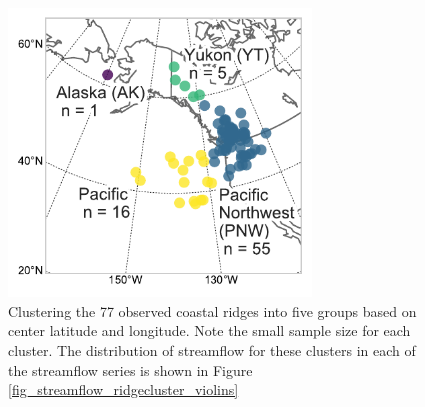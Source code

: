\documentclass[final, double]{ua-thesis}
\begin{document}
\begin{figure}[ht]
 \centerline{\includegraphics[width=19pc]{p2figures/fig_ridge_clustermap.pdf}}
  \caption{Clustering the 77 observed coastal ridges into five groups based on center latitude and longitude. Note the small sample size for each cluster. The distribution of streamflow for these clusters in each of the streamflow series is shown in Figure \ref{fig_streamflow_ridgecluster_violins}}\label{fig_ridge_clustermap}
\end{figure}
\end{document}
